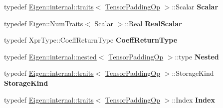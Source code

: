 \begin{DoxyCompactItemize}
typedef \hyperlink{struct_eigen_1_1internal_1_1traits}{Eigen\+::internal\+::traits}$<$ \hyperlink{class_eigen_1_1_tensor_padding_op}{Tensor\+Padding\+Op} $>$\+::Scalar {\bfseries Scalar}
\item 
\mbox{\label{class_eigen_1_1_tensor_padding_op_a8725abf6611cc6868211f21bd7a34df0}} 
typedef \hyperlink{group___core___module_struct_eigen_1_1_num_traits}{Eigen\+::\+Num\+Traits}$<$ Scalar $>$\+::Real {\bfseries Real\+Scalar}
\item 
\mbox{\label{class_eigen_1_1_tensor_padding_op_a03d812907c627e4669763b0cce1f5861}} 
typedef Xpr\+Type\+::\+Coeff\+Return\+Type {\bfseries Coeff\+Return\+Type}
\item 
\mbox{\label{class_eigen_1_1_tensor_padding_op_abd4bea6390103e3fd014b1ef6d27f71b}} 
typedef \hyperlink{struct_eigen_1_1internal_1_1nested}{Eigen\+::internal\+::nested}$<$ \hyperlink{class_eigen_1_1_tensor_padding_op}{Tensor\+Padding\+Op} $>$\+::type {\bfseries Nested}
\item 
\mbox{\label{class_eigen_1_1_tensor_padding_op_a6f349272eaddec6978350ef676160986}} 
typedef \hyperlink{struct_eigen_1_1internal_1_1traits}{Eigen\+::internal\+::traits}$<$ \hyperlink{class_eigen_1_1_tensor_padding_op}{Tensor\+Padding\+Op} $>$\+::Storage\+Kind {\bfseries Storage\+Kind}
\item 
\mbox{\label{class_eigen_1_1_tensor_padding_op_a1d8e56fe8fa67418b6fbdca29bb6f7ba}} 
typedef \hyperlink{struct_eigen_1_1internal_1_1traits}{Eigen\+::internal\+::traits}$<$ \hyperlink{class_eigen_1_1_tensor_padding_op}{Tensor\+Padding\+Op} $>$\+::Index {\bfseries Index}
\end{DoxyCompactItemize}
